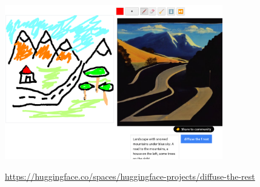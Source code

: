 \documentclass[17pt,aspectratio=169,hyperref={pdfusetitle,colorlinks,allcolors=olive}]{beamer}
\begin{document}
\begin{frame}[fragile]

  \begin{center}
    \includegraphics[width=9.5cm]{figs/sd-mountains}
  \end{center}

  \begin{flushright}
    {\scriptsize
    \url{https://huggingface.co/spaces/huggingface-projects/diffuse-the-rest} \\
    }
  \end{flushright}
    
\end{frame}
\end{document}
